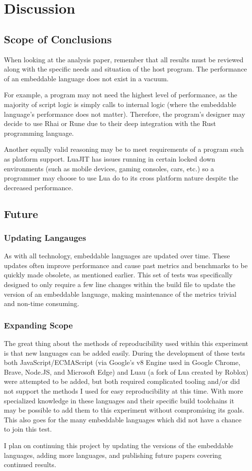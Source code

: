 \section{Discussion} \label{sec:discussion}

\subsection{Scope of Conclusions} \label{sec:discussion:importance}
When looking at the analysis paper, remember that all results must be reviewed along with the specific needs and situation of the host program. The performance of an embeddable language does not exist in a vacuum.

For example, a program may not need the highest level of performance, as the majority of script logic is simply calls to internal logic (where the embeddable language's performance does not matter). Therefore, the program's designer may decide to use Rhai or Rune due to their deep integration with the Rust programming language.

Another equally valid reasoning may be to meet requirements of a program such as platform support. LuaJIT has issues running in certain locked down environments\cite{luajit:consoles} (such as mobile devices, gaming consoles, cars, etc.) so a programmer may choose to use Lua do to its cross platform nature despite the decreased performance.

\subsection{Future}

\subsubsection{Updating Langauges}
As with all technology, embeddable languages are updated over time. These updates often improve performance and cause past metrics and benchmarks to be quickly made obsolete, as mentioned earlier. This set of tests was specifically designed to only require a few line changes within the build file to update the version of an embeddable language, making maintenance of the metrics trivial and non-time consuming.

\subsubsection{Expanding Scope}
The great thing about the methods of reproducibility used within this experiment is that new languages can be added easily. During the development of these tests both JavaScript/ECMAScript (via Google's v8 Engine\cite{v8} used in Google Chrome, Brave, Node.JS, and Microsoft Edge) and Luau (a fork of Lua created by Roblox\cite{luau}) were attempted to be added, but both required complicated tooling and/or did not support the methods I used for easy reproducibility at this time. With more specialized knowledge in these languages and their specific build toolchains it may be possible to add them to this experiment without compromising its goals. This also goes for the many embeddable languages which did not have a chance to join this test.

I plan on continuing this project by updating the versions of the embeddable languages, adding more languages, and publishing future papers covering continued results.
